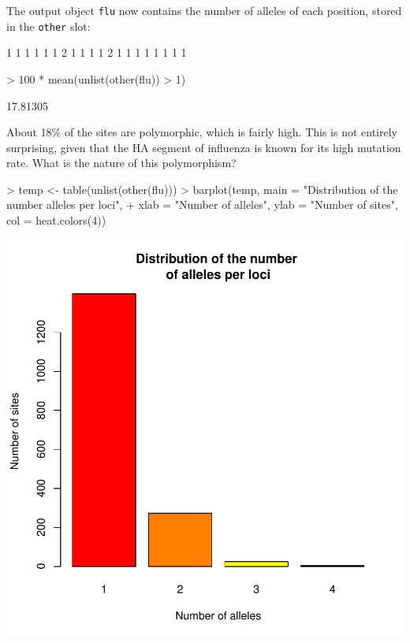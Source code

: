 \documentclass{article}
\begin{document}
\noindent The output object \texttt{flu} now contains the number of alleles of each position, stored
in the \texttt{other} slot:
\begin{Schunk}
\begin{Soutput}
 [1] 1 1 1 1 1 1 2 1 1 1 1 2 1 1 1 1 1 1 1 1
\end{Soutput}
\begin{Sinput}
> 100 * mean(unlist(other(flu)) > 1)
\end{Sinput}
\begin{Soutput}
[1] 17.81305
\end{Soutput}
\end{Schunk}
About 18\% of the sites are polymorphic, which is fairly high.
This is not entirely surprising, given that the HA segment of influenza is known for its high
mutation rate.
What is the nature of this polymorphism?
\begin{Schunk}
\begin{Sinput}
> temp <- table(unlist(other(flu)))
> barplot(temp, main = "Distribution of the number \nof alleles per loci", 
+     xlab = "Number of alleles", ylab = "Number of sites", col = heat.colors(4))
\end{Sinput}
\end{Schunk}
\includegraphics{figs/genomics-030}
\end{document}
